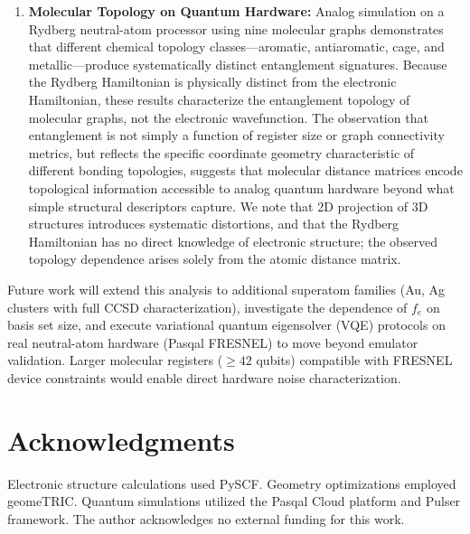 \documentclass[12pt,a4paper]{article}
\begin{document}
\begin{enumerate}
  \item \textbf{Molecular Topology on Quantum Hardware:} Analog simulation
    on a Rydberg neutral-atom processor using nine molecular graphs
    demonstrates that different chemical topology classes---aromatic,
    antiaromatic, cage, and metallic---produce systematically distinct
    entanglement signatures. Because the Rydberg Hamiltonian is physically
    distinct from the electronic Hamiltonian, these results characterize
    the entanglement topology of molecular graphs, not the electronic
    wavefunction. The observation that entanglement is not simply a
    function of register size or graph connectivity metrics, but
    reflects the specific coordinate geometry characteristic of different
    bonding topologies, suggests that molecular distance matrices encode
    topological information accessible to analog quantum hardware beyond what
    simple structural descriptors capture. We note that 2D projection of 3D
    structures introduces systematic distortions, and that the Rydberg
    Hamiltonian has no direct knowledge of electronic structure; the observed
    topology dependence arises solely from the atomic distance matrix.
\end{enumerate}

Future work will extend this analysis to additional superatom families
(Au, Ag clusters with full CCSD characterization), investigate the
dependence of $f_e$ on basis set size, and execute variational quantum
eigensolver (VQE) protocols on real neutral-atom hardware (Pasqal FRESNEL)
to move beyond emulator validation. Larger molecular registers ($\geq 42$
qubits) compatible with FRESNEL device constraints would enable direct
hardware noise characterization.

\section*{Acknowledgments}

Electronic structure calculations used PySCF.\cite{sun2018pyscf,sun2020recent}
Geometry optimizations employed geomeTRIC.\cite{wang2016geometry}
Quantum simulations utilized the Pasqal Cloud platform and Pulser
framework.\cite{henriet2020quantum} The author acknowledges no external
funding for this work.



\end{document}
